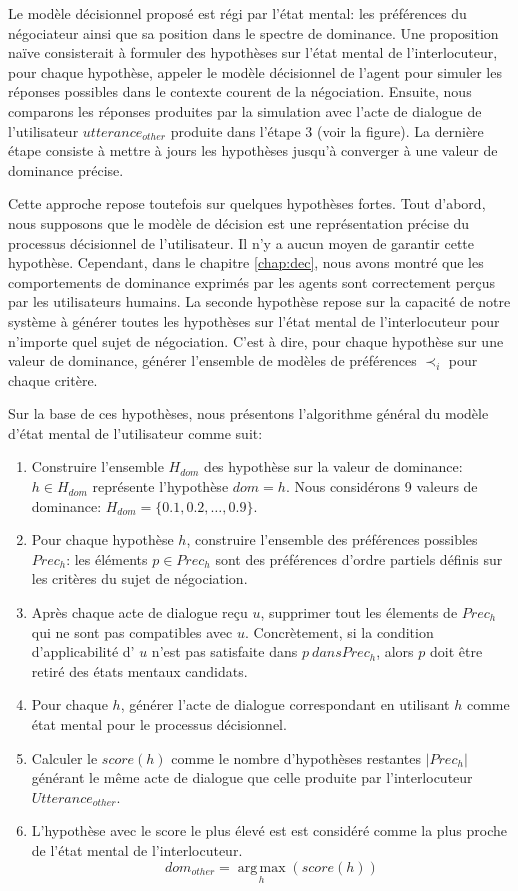 	Le modèle décisionnel proposé est régi par l'état mental: les préférences du négociateur ainsi que sa position dans le spectre de dominance. Une proposition naïve consisterait à formuler des hypothèses sur l'état mental de l'interlocuteur, pour chaque hypothèse, appeler le modèle décisionnel de l'agent pour simuler les réponses possibles dans le contexte courent de la négociation. Ensuite, nous comparons les réponses produites par la simulation avec l'acte de dialogue de l'utilisateur $utterance_{other}$ produite dans l'étape 3 (voir la figure). 
	La dernière étape consiste à mettre à jours les hypothèses jusqu'à converger à une valeur de dominance précise. 
	
	Cette approche repose toutefois sur quelques hypothèses fortes. Tout d'abord, nous supposons que le modèle de décision est une représentation précise du processus décisionnel de l'utilisateur. Il n'y a aucun moyen de garantir cette hypothèse. Cependant, dans le chapitre \ref{chap:dec}, nous avons montré que les comportements de dominance exprimés par les agents sont correctement perçus par les utilisateurs humains. La seconde hypothèse repose sur la capacité de notre système à générer toutes les hypothèses sur l'état mental de l'interlocuteur pour n'importe quel sujet de négociation. C'est à dire, pour chaque hypothèse sur une valeur de dominance, générer l'ensemble de modèles de préférences $\prec_i$ pour chaque critère.
	
	Sur la base de ces hypothèses, nous présentons l'algorithme général du modèle d'état mental de l'utilisateur comme suit:

		\begin{enumerate}
			\item Construire l'ensemble $H_{dom}$ des hypothèse sur la valeur de dominance: $h\in H_{dom}$ représente l'hypothèse $dom=h$. Nous considérons 9 valeurs de dominance: $H_{dom}=\{0.1, 0.2, \ldots, 0.9\}$.
			\item Pour chaque hypothèse $h$, construire l'ensemble des préférences possibles $Prec_h$: les éléments $p\in Prec_h$ sont des préférences d'ordre partiels définis sur les critères du sujet de négociation.
			
			\item Après chaque acte de dialogue reçu $u$, supprimer tout les élements de $Prec_h$ qui ne sont pas compatibles avec $u$. Concrètement, si la condition d'applicabilité d' $u$ n'est pas satisfaite dans $p \ dans Prec_h$, alors $p$ doit être retiré des états mentaux candidats.
			\item Pour chaque $h$, générer l'acte de dialogue correspondant en utilisant $h$ comme état mental pour le processus décisionnel.
			\item Calculer le $score(h)$ comme le nombre d'hypothèses restantes $|Prec_h|$ générant le même acte de dialogue que celle produite par l'interlocuteur $Utterance_{other}$. 
			\item 	L'hypothèse avec le score le plus élevé est est considéré comme la plus proche de l'état mental de l'interlocuteur.
			$$dom_{other} = \operatorname*{arg\,max}_{h} (score(h))$$
		\end{enumerate}
		
